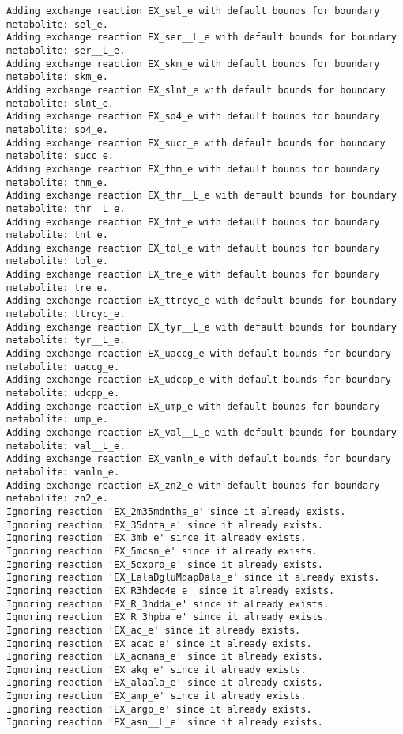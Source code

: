 \documentclass[
  letterpaper,
  DIV=11,
  numbers=noendperiod]{scrartcl}
\begin{document}
\begin{verbatim}
Adding exchange reaction EX_sel_e with default bounds for boundary metabolite: sel_e.
Adding exchange reaction EX_ser__L_e with default bounds for boundary metabolite: ser__L_e.
Adding exchange reaction EX_skm_e with default bounds for boundary metabolite: skm_e.
Adding exchange reaction EX_slnt_e with default bounds for boundary metabolite: slnt_e.
Adding exchange reaction EX_so4_e with default bounds for boundary metabolite: so4_e.
Adding exchange reaction EX_succ_e with default bounds for boundary metabolite: succ_e.
Adding exchange reaction EX_thm_e with default bounds for boundary metabolite: thm_e.
Adding exchange reaction EX_thr__L_e with default bounds for boundary metabolite: thr__L_e.
Adding exchange reaction EX_tnt_e with default bounds for boundary metabolite: tnt_e.
Adding exchange reaction EX_tol_e with default bounds for boundary metabolite: tol_e.
Adding exchange reaction EX_tre_e with default bounds for boundary metabolite: tre_e.
Adding exchange reaction EX_ttrcyc_e with default bounds for boundary metabolite: ttrcyc_e.
Adding exchange reaction EX_tyr__L_e with default bounds for boundary metabolite: tyr__L_e.
Adding exchange reaction EX_uaccg_e with default bounds for boundary metabolite: uaccg_e.
Adding exchange reaction EX_udcpp_e with default bounds for boundary metabolite: udcpp_e.
Adding exchange reaction EX_ump_e with default bounds for boundary metabolite: ump_e.
Adding exchange reaction EX_val__L_e with default bounds for boundary metabolite: val__L_e.
Adding exchange reaction EX_vanln_e with default bounds for boundary metabolite: vanln_e.
Adding exchange reaction EX_zn2_e with default bounds for boundary metabolite: zn2_e.
Ignoring reaction 'EX_2m35mdntha_e' since it already exists.
Ignoring reaction 'EX_35dnta_e' since it already exists.
Ignoring reaction 'EX_3mb_e' since it already exists.
Ignoring reaction 'EX_5mcsn_e' since it already exists.
Ignoring reaction 'EX_5oxpro_e' since it already exists.
Ignoring reaction 'EX_LalaDgluMdapDala_e' since it already exists.
Ignoring reaction 'EX_R3hdec4e_e' since it already exists.
Ignoring reaction 'EX_R_3hdda_e' since it already exists.
Ignoring reaction 'EX_R_3hpba_e' since it already exists.
Ignoring reaction 'EX_ac_e' since it already exists.
Ignoring reaction 'EX_acac_e' since it already exists.
Ignoring reaction 'EX_acmana_e' since it already exists.
Ignoring reaction 'EX_akg_e' since it already exists.
Ignoring reaction 'EX_alaala_e' since it already exists.
Ignoring reaction 'EX_amp_e' since it already exists.
Ignoring reaction 'EX_argp_e' since it already exists.
Ignoring reaction 'EX_asn__L_e' since it already exists.

\end{verbatim}
\end{document}
